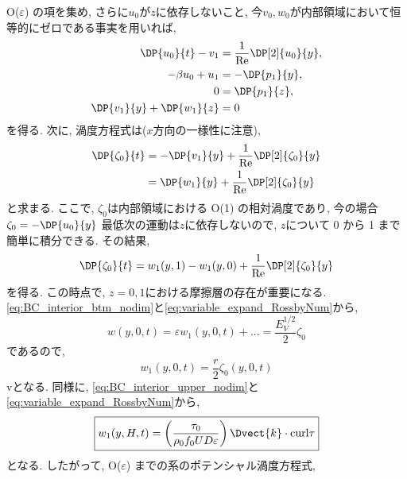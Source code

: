 O($\varepsilon$) の項を集め, さらに$u_0$が$z$に依存しないこと, 今$v_0,w_0$が内部領域において恒等的にゼロである事実を用いれば, 
\begin{subequations}
\begin{align}
  \DP{u_0}{t}             - v_1 &=                 \dfrac{1}{\rm Re}\DP[2]{u_0}{y}, 
  \label{eq:x_momem_nondim_orderRo} \\
              - \beta u_0 + u_1 &= - \DP{p_1}{y}, 
  \label{eq:y_momem_nondim_orderRo}  \\
                              0 &= \DP{p_1}{z}, 
  \label{eq:hydrostatic_nondim_orderRo} \\
  \DP{v_1}{y} + \DP{w_1}{z}     &= 0 
  \label{eq:continuity_nondim_orderRo}
\end{align}
\end{subequations}
を得る. 
次に, 渦度方程式は($x$方向の一様性に注意), 
\begin{equation}
\begin{split}
    \DP{\zeta_0}{t} &= - \DP{v_1}{y} + \dfrac{1}{\rm Re}\DP[2]{\zeta_0}{y} \\
                    &=   \DP{w_1}{y} + \dfrac{1}{\rm Re}\DP[2]{\zeta_0}{y}   
\end{split}   
\end{equation}
と求まる. 
ここで, $\zeta_0$は内部領域における O(1) の相対渦度であり, 今の場合$\zeta_0 = -\DP{u_0}{y}$
最低次の運動は$z$に依存しないので, $z$について 0 から 1 まで簡単に積分できる. 
その結果, 
\begin{equation}
  \DP{\zeta_0}{t} = w_1(y,1) - w_1(y,0) + \dfrac{1}{\rm Re}\DP[2]{\zeta_0}{y} 
\end{equation}
を得る. 
この時点で, $z=0,1$における摩擦層の存在が重要になる. 
\eqref{eq:BC_interior_btm_nodim}と\eqref{eq:variable_expand_RossbyNum}から, 
\begin{equation}
  w(y,0,t) = \varepsilon w_1(y,0,t) + ... = \dfrac{E_V^{1/2}}{2} \zeta_0
\end{equation}
であるので, 
\begin{equation}
\boxed{
  w_1(y,0,t) = \dfrac{r}{2} \zeta_0(y,0,t)
}
\end{equation}
vとなる. 
同様に, \eqref{eq:BC_interior_upper_nodim}と\eqref{eq:variable_expand_RossbyNum}から, 
\begin{equation}
\boxed{
  w_1(y,H,t) = \left(\dfrac{\tau_0}{\rho_0 f_0 U D \varepsilon} \right) \Dvect{k} \cdot {\rm curl \tau}
}
\end{equation}
となる.
したがって, O($\varepsilon$) までの系のポテンシャル渦度方程式, 
